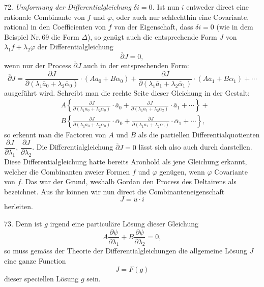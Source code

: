 72. \textit{Umformung der Differentialgleichung $\delta i=0$.} Ist nun $i$ entweder direct eine rationale Combinante von $f$ und $\varphi$, oder auch nur schlechthin eine Covariante, rational in den Coefficienten von $f$ von der Eigenschaft, dass $\delta i=0$ (wie in dem Beispiel Nr.\,69 die Form $\varDelta$), so genügt auch die entsprechende Form $J$ von $\lambda_1 f+\lambda_2\varphi$ der Differentialgleichung
\[
\overline{\partial} J=0,
\]
wenn nur der Process $\overline{\partial} J$ auch in der entsprechenden Form:
\[
\overline{\partial} J=\frac{\partial J}{\partial(\lambda_1\overline{a}_0+\lambda_2\overline{\alpha}_0)}\cdot(A\overline{a}_0+B\overline{\alpha}_0)+\frac{\partial J}{\partial(\lambda_1\overline{a}_1+\lambda_2\overline{\alpha}_1)}\cdot(A\overline{a}_1+B\overline{\alpha}_1)+\cdots
\]
ausgeführt wird. Schreibt man die rechte Seite dieser Gleichung in der Gestalt:
\[
\begin{aligned}
&A\left\{\frac{\partial J}{\partial(\lambda_1\overline{a}_0+\lambda_2\overline{\alpha}_0)}\cdot\overline{a}_0+\frac{\partial J}{\partial(\lambda_1\overline{a}_1+\lambda_2\overline{\alpha}_2)}\cdot\overline{a}_1+\cdots\right\}+\\
&B\left\{\frac{\partial J}{\partial(\lambda_1\overline{a}_0+\lambda_2\overline{\alpha}_0)}\cdot\overline{\alpha}_0+\frac{\partial J}{\partial(\lambda_1\overline{a}_1+\lambda_2\overline{\alpha}_1)}\cdot\overline{\alpha}_1+\cdots\right\},
\end{aligned}
\]
so erkennt man die Factoren von $A$ und $B$ als die partiellen Differentialquotienten $\dfrac{\partial J}{\partial\lambda_1}$, $\dfrac{\partial J}{\partial\lambda_2}$. Die Differentialgleichung $\overline{\partial} J=0$ lässt sich also auch durch
darstellen. Diese Differentialgleichung hatte bereits Aronhold als jene Gleichung erkannt, welcher die Combinanten zweier Formen $f$ und $\varphi$ genügen, wenn $\varphi$ Covariante von $f$. Das war der Grund, weshalb Gordan den Process des Deltairens als  bezeichnet. Aus ihr können wir nun direct die Combinanteneigenschaft
\[
J=u\cdot i
\]
herleiten.

73. Denn ist $g$ irgend eine particuläre Lösung dieser Gleichung
\[
A\frac{\partial\psi}{\partial\lambda_1}+B\frac{\partial\psi}{\partial\lambda_2}=0,
\]
so muss gemäss der Theorie der Differentialgleichungen die allgemeine Lösung $J$ eine ganze Function
\[
J=F(g)
\]
dieser speciellen Lösung $g$ sein.

